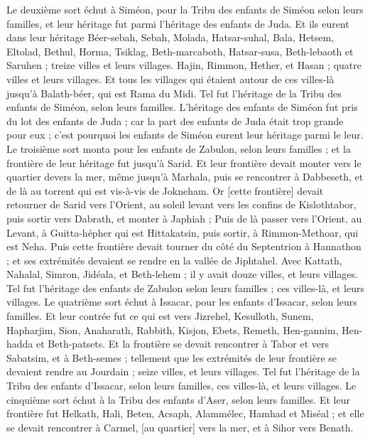 \begin{multicols}{2}
\VerseOne{}Le deuxième sort échut à Siméon, pour la Tribu des enfants de Siméon selon leurs familles, et leur héritage fut parmi l'héritage des enfants de Juda.
Et ils eurent dans leur héritage Béer-sebah, Sebah, Molada,
Hatsar-suhal, Bala, Hetsem,
Eltolad, Bethul, Horma,
Tsiklag, Beth-marcaboth, Hatsar-susa,
Beth-lebaoth et Saruhen ; treize villes et leurs villages.
Hajin, Rimmon, Hether, et Hasan ; quatre villes et leurs villages.
Et tous les villages qui étaient autour de ces villes-là jusqu'à Balath-béer, qui est Rama du Midi. Tel fut l'héritage de la Tribu des enfants de Siméon, selon leurs familles.
L'héritage des enfants de Siméon fut pris du lot des enfants de Juda ; car la part des enfants de Juda était trop grande pour eux ; c'est pourquoi les enfants de Siméon eurent leur héritage parmi le leur.
Le troisième sort monta pour les enfants de Zabulon, selon leurs familles ; et la frontière de leur héritage fut jusqu'à Sarid.
Et leur frontière devait monter vers le quartier devers la mer, même jusqu'à Marhala, puis se rencontrer à Dabbeseth, et de là au torrent qui est vis-à-vis de Jokneham.
Or [cette frontière] devait retourner de Sarid vers l'Orient, au soleil levant vers les confins de Kislothtabor, puis sortir vers Dabrath, et monter à Japhiah ;
Puis de là passer vers l'Orient, au Levant, à Guitta-hépher qui est Hittakatsin, puis sortir, à Rimmon-Methoar, qui est Neha.
Puis cette frontière devait tourner du côté du Septentrion à Hannathon ; et ses extrémités devaient se rendre en la vallée de Jiphtahel.
Avec Kattath, Nahalal, Simron, Jidéala, et Beth-lehem ; il y avait douze villes, et leurs villages.
Tel fut l'héritage des enfants de Zabulon selon leurs familles ; ces villes-là, et leurs villages.
Le quatrième sort échut à Issacar, pour les enfants d'Issacar, selon leurs familles.
Et leur contrée fut ce qui est vers Jizrehel, Kesulloth, Sunem,
Hapharjim, Sion, Anaharath,
Rabbith, Kisjon, Ebets,
Remeth, Hen-gannim, Hen-hadda et Beth-patsets.
Et la frontière se devait rencontrer à Tabor et vers Sabatsim, et à Beth-semes ; tellement que les extrémités de leur frontière se devaient rendre au Jourdain ; seize villes, et leurs villages.
Tel fut l'héritage de la Tribu des enfants d'Issacar, selon leurs familles, ces villes-là, et leurs villages.
Le cinquième sort échut à la Tribu des enfants d'Aser, selon leurs familles.
Et leur frontière fut Helkath, Hali, Beten, Acsaph,
Alammélec, Hamhad et Miséal ; et elle se devait rencontrer à Carmel, [au quartier] vers la mer, et à Sihor vers Benath.

\end{multicols}
